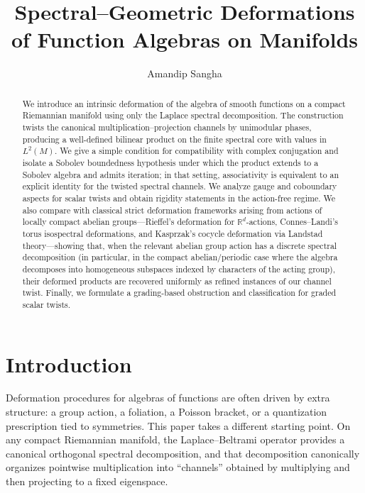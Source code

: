 \documentclass[11pt]{amsart}
\title{Spectral--Geometric Deformations of Function Algebras on Manifolds}
\author{Amandip Sangha}
\theoremstyle{plain}
\theoremstyle{definition}
\theoremstyle{remark}
\begin{document}
\begin{abstract}
We introduce an intrinsic deformation of the algebra of smooth functions on a compact Riemannian manifold using only the Laplace spectral decomposition.  The construction twists the canonical multiplication--projection channels by unimodular phases, producing a well-defined bilinear product on the finite spectral core with values in $L^2(M)$.  We give a simple condition for compatibility with complex conjugation and isolate a Sobolev boundedness hypothesis under which the product extends to a Sobolev algebra and admits iteration; in that setting, associativity is equivalent to an explicit identity for the twisted spectral channels.  We analyze gauge and coboundary aspects for scalar twists and obtain rigidity statements in the action-free regime.  We also compare with classical strict deformation frameworks arising from actions of locally compact abelian groups---Rieffel's deformation for $\mathbb{R}^d$-actions, Connes--Landi's torus isospectral deformations, and Kasprzak's cocycle deformation via Landstad theory---showing that, when the relevant abelian group action has a discrete spectral decomposition (in particular, in the compact abelian/periodic case where the algebra decomposes into homogeneous subspaces indexed by characters of the acting group), their deformed products are recovered uniformly as refined instances of our channel twist.  Finally, we formulate a grading-based obstruction and classification for graded scalar twists.
\end{abstract}

\maketitle

\setcounter{tocdepth}{1}
\tableofcontents

\section{Introduction}

Deformation procedures for algebras of functions are often driven by extra structure: a group action, a foliation, a Poisson bracket, or a quantization prescription tied to symmetries.  This paper takes a different starting point.  On any compact Riemannian manifold, the Laplace--Beltrami operator provides a canonical orthogonal spectral decomposition, and that decomposition canonically organizes pointwise multiplication into ``channels'' obtained by multiplying and then projecting to a fixed eigenspace.
\end{document}
